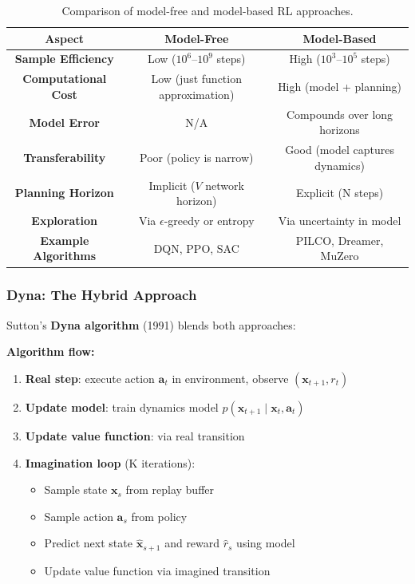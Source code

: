 \begin{table}[h]
    \centering
    \small
    \begin{tabular}{|c|c|c|}
        \hline
        \textbf{Aspect} & \textbf{Model-Free} & \textbf{Model-Based} \\
        \hline
        \textbf{Sample Efficiency} & Low ($10^6$--$10^9$ steps) & High ($10^3$--$10^5$ steps) \\
        \hline
        \textbf{Computational Cost} & Low (just function approximation) & High (model + planning) \\
        \hline
        \textbf{Model Error} & N/A & Compounds over long horizons \\
        \hline
        \textbf{Transferability} & Poor (policy is narrow) & Good (model captures dynamics) \\
        \hline
        \textbf{Planning Horizon} & Implicit ($V$ network horizon) & Explicit (N steps) \\
        \hline
        \textbf{Exploration} & Via $\epsilon$-greedy or entropy & Via uncertainty in model \\
        \hline
        \textbf{Example Algorithms} & DQN, PPO, SAC & PILCO, Dreamer, MuZero \\
        \hline
    \end{tabular}
    \caption{Comparison of model-free and model-based RL approaches.}
\end{table}

\subsubsection{Dyna: The Hybrid Approach}

Sutton's \textbf{Dyna algorithm} (1991) blends both approaches:

\textbf{Algorithm flow:}
\begin{enumerate}
    \item \textbf{Real step}: execute action $\mathbf{a}_t$ in environment, observe $(\mathbf{x}_{t+1}, r_t)$
    \item \textbf{Update model}: train dynamics model $p(\mathbf{x}_{t+1} \mid \mathbf{x}_t, \mathbf{a}_t)$
    \item \textbf{Update value function}: via real transition
    \item \textbf{Imagination loop} (K iterations):
    \begin{itemize}
        \item Sample state $\mathbf{x}_s$ from replay buffer
        \item Sample action $\mathbf{a}_s$ from policy
        \item Predict next state $\hat{\mathbf{x}}_{s+1}$ and reward $\hat{r}_s$ using model
        \item Update value function via imagined transition
    \end{itemize}
\end{enumerate}

